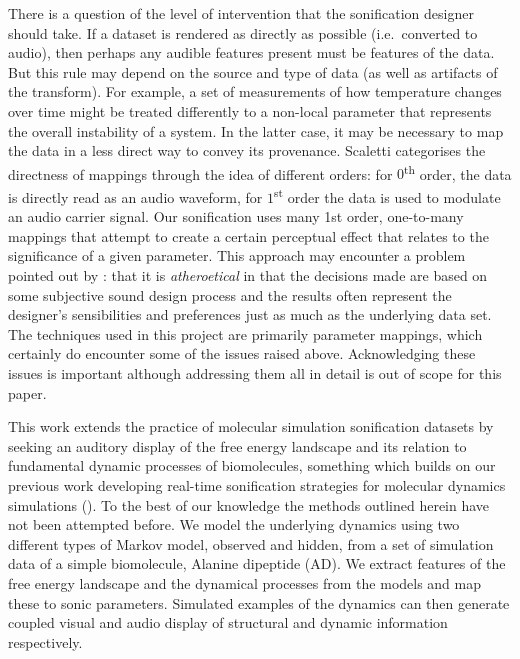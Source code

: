 \documentclass[a4paper,10pt,oneside]{article}
\begin{document}
\begin{sloppy}
  There is a question of the level of intervention that the sonification designer should take. If a dataset is rendered as directly as possible (i.e.\ converted to audio), then perhaps any audible features present must be features of the data. But this rule may depend on the source and type of data (as well as artifacts of the transform). For example, a set of measurements of how temperature changes over time might be treated differently to a non-local parameter that represents the overall instability of a system. In the latter case, it may be necessary to map the data in a less direct way to convey its provenance.  
  Scaletti \cite{Scaletti1994} categorises the directness of mappings through the idea of different orders: for $0$\textsuperscript{th} order, the data is directly read as an audio waveform, for $1$\textsuperscript{st} order the data is used to modulate an audio carrier signal.  
  Our sonification uses many 1st order, one-to-many \cite{Hunt2000} mappings that attempt to create a certain perceptual effect that relates to the significance of a given parameter.
  This approach may encounter a problem pointed out by \cite{Murphy2006}: that it is \emph{atheroetical} in that the decisions made are based on some subjective sound design process and the results often represent the designer’s sensibilities and preferences just as much as the underlying data set. The techniques used in this project are primarily parameter mappings, which certainly do encounter some of the issues raised above. Acknowledging these issues is important although addressing them all in detail is out of scope for this paper.

  This work extends the practice of molecular simulation sonification datasets by seeking an auditory display of the free energy landscape and its relation to fundamental dynamic processes of biomolecules, something which builds on our previous work developing real-time sonification strategies for molecular dynamics simulations (\cite{C4FD00008K, ds2016, glow2013}). To the best of our knowledge the methods outlined herein have not been attempted before. We model the underlying dynamics using two different types of Markov model, observed and hidden, from a set of simulation data of a simple biomolecule, Alanine dipeptide (AD). We extract features of the free energy landscape and the dynamical processes from the models and map these to sonic parameters. Simulated examples of the dynamics can then generate coupled visual and audio display of structural and dynamic information respectively. 


\end{sloppy}
\end{document}
